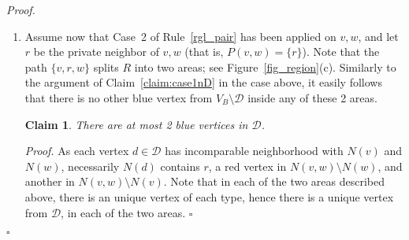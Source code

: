\documentclass[a4paper,11pt]{article}
\newtheorem{claimN} {Claim}
\newcommand{\rrgl}   [1] {Rule~\ref{#1}\xspace}
\newenvironment{proof}{\noindent \textit{Proof. }}{\hfill$\square$\vspace{.2cm}}
\begin{document}
\begin{proof}
\begin{enumerate}
\begin{proof}
     Note that the graph $G[V(R) \setminus (\{r',r''\} \cup \mathcal{D})]$ is connected, as all its vertices distinct from $v$ and $w$ are neighbors of at least one of them, and $v$ and $w$ are linked by a path of the boundary of $R$. Let $M$ be the graph obtained from $G[V(R)]$ by contracting the (connected) subgraph $G[V(R) \setminus (\{r',r''\} \cup \mathcal{D})]$ into a single vertex, say $c$. Note that the vertex set of $M$ consists of $r',r'',c$, and the vertices in $\mathcal{D}$, and that by construction $M$ is a minor of $G$. Recall that for $i \in \{1,2,3\}$, $N(d_i) \cap (V(R) \setminus \{r',r''\}) \neq \emptyset$, which is equivalent to saying that for $i \in \{1,2,3\}$ vertex $d_i$ is adjacent to vertex $c$ in $M$. It follows that $M$ contains a subgraph isomorphic to $K_{3,3}$ defined by the bipartition $\{r',r'',c\}$ and $\{d_1,d_2,d_3\}$, which is also a minor of $G$, contradicting by Kuratowski's Theorem~\cite{Die05} the hypothesis that $G$ is a planar graph.
\end{proof}

\item
Assume now that Case~2 of \rrgl{rgl_pair}  has been applied on $v,w$, and let $r$ be the private neighbor of $v,w$ (that is, $P(v,w) =  \{r\}$). Note that the path $\{v,r,w \}$ splits $R$ into two areas; see Figure~\ref{fig_region}(c). Similarly to the argument of Claim~\ref{claim:case1nD} in the case above, it easily follows that there is no other blue vertex from $V_B \setminus \mathcal{D}$ inside any of these 2 areas.

    \begin{claimN}\label{claim:case2D}
There are at most 2 blue vertices in $\mathcal{D}$.
    \end{claimN}

    \begin{proof} As each vertex $d \in \mathcal{D}$ has incomparable neighborhood with $N(v)$ and $N(w)$, necessarily $N(d)$ contains $r$, a red vertex in $N(v,w) \setminus N(w)$, and another in $N(v,w) \setminus N(v)$. Note that in each of the two areas described above, there is an unique vertex of each type, hence there is a unique vertex from $\mathcal{D}$, in each of the two areas.
    \end{proof}


\end{enumerate}
\end{proof}
\end{document}

